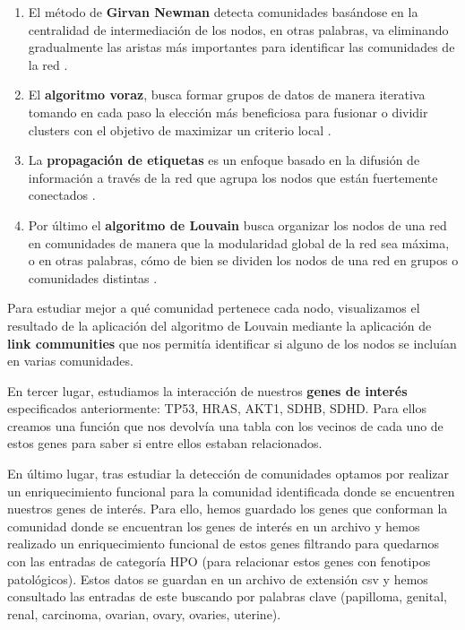 \vspace{3pt}
\begin{enumerate}
\item El método de \textbf{Girvan Newman} detecta comunidades basándose en la centralidad de intermediación de los nodos, en otras palabras, va eliminando gradualmente las aristas más importantes para identificar las comunidades de la red \cite{Zahiri2023}.


\item El \textbf{algoritmo voraz}, busca formar grupos de datos de manera iterativa tomando en cada paso la elección más beneficiosa para fusionar o dividir clusters con el objetivo de maximizar un criterio local \cite{Curtis2003}. 


\item La \textbf{propagación de etiquetas} es un enfoque basado en la difusión de información a través de la red que agrupa los nodos que están fuertemente conectados \cite{Garza2019}.

\item Por último el \textbf{algoritmo de Louvain} busca organizar los nodos de una red en comunidades de manera que la modularidad global de la red sea máxima, o en otras palabras, cómo de bien se dividen los nodos de una red en grupos o comunidades distintas \cite{Zhang2021}.

\end{enumerate}

\vspace{3pt}

Para estudiar mejor a qué comunidad pertenece cada nodo, visualizamos el resultado de la aplicación del algoritmo de Louvain mediante la aplicación de \textbf{link communities} que nos permitía identificar si alguno de los nodos se incluían en varias comunidades. 

\vspace{3pt}

En tercer lugar, estudiamos la interacción de nuestros \textbf{genes de interés} especificados anteriormente: TP53, HRAS, AKT1, SDHB, SDHD. Para ellos creamos una función que nos devolvía una tabla con los vecinos de cada uno de estos genes para saber si entre ellos estaban relacionados.

\vspace{3pt}

En último lugar, tras estudiar la detección de comunidades optamos por realizar un enriquecimiento funcional para la comunidad identificada donde se encuentren nuestros genes de interés. Para ello, hemos guardado los genes que conforman la comunidad donde se encuentran los genes de interés en un archivo y hemos realizado un enriquecimiento funcional de estos genes filtrando para quedarnos con las entradas de categoría HPO \cite{hpojax} (para relacionar estos genes con fenotipos patológicos).  Estos datos se guardan en un archivo de extensión csv y hemos consultado las entradas de este buscando por palabras clave (papilloma, genital, renal, carcinoma, ovarian, ovary, ovaries, uterine). 


